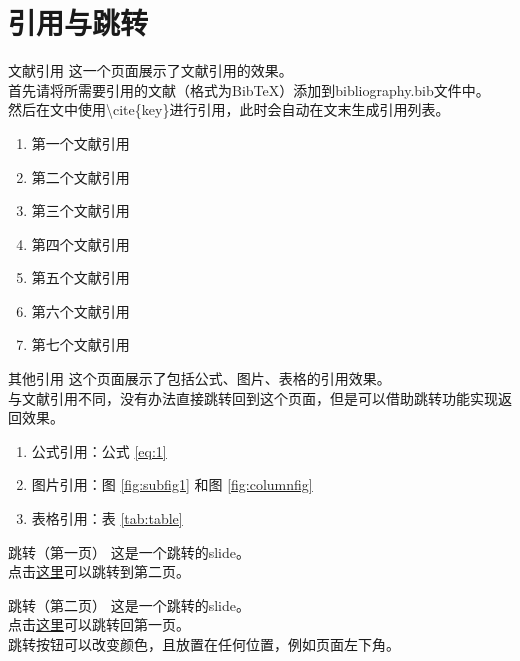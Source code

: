\documentclass[aspectratio=169]{beamer}
\begin{document}
\section{引用与跳转}

\begin{frame}{文献引用}
    这一个页面展示了文献引用的效果。\\
    首先请将所需要引用的文献（格式为BibTeX）添加到bibliography.bib文件中。\\
    然后在文中使用\textbackslash cite\{key\}进行引用，此时会自动在文末生成引用列表。\\
    \begin{enumerate}
        \item 第一个文献引用\cite{fu2022kxnet}
        \item 第二个文献引用\cite{celledoni2021equivariant}
        \item 第三个文献引用\cite{chen2023imaging}
        \item 第四个文献引用\cite{sannai2021improved}
        \item 第五个文献引用\cite{fu2024rotation}
        \item 第六个文献引用\cite{xie2022fourier}
        \item 第七个文献引用\cite{weiler2018learning}
    \end{enumerate}
\end{frame}

\begin{frame}{其他引用}
    这个页面展示了包括公式、图片、表格的引用效果。\\
    与文献引用不同，没有办法直接跳转回到这个页面，但是可以借助跳转功能实现返回效果。
    \begin{enumerate}
        \item 公式引用：公式 \eqref{eq:1}
        \item 图片引用：图 \ref{fig:subfig1} 和图 \ref{fig:columnfig}
        \item 表格引用：表 \ref{tab:table}
    \end{enumerate}
\end{frame}

\begin{frame}[label=jump1]{跳转（第一页）}
    这是一个跳转的slide。\\
    点击\hyperlink{jump2}{这里}可以跳转到第二页。
\end{frame}

\begin{frame}[label=jump2]{跳转（第二页）}
    \vspace{2cm}
    这是一个跳转的slide。\\
    点击\hyperlink{jump1}{这里}可以跳转回第一页。\\
    跳转按钮可以改变颜色，且放置在任何位置，例如页面左下角。\\
    \vspace{2cm}
    \hyperlink{jump1}{}
\end{frame}
\end{document}
